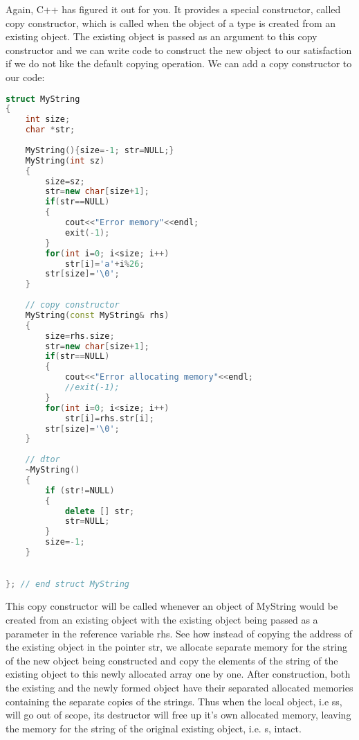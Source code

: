\documentclass[11pt,fleqn]{book} %
\begin{document}
Again, C++ has figured it out for you. It provides a special constructor, called copy constructor, which is called when the object of a type is created from an existing object. The existing object is passed as an argument to this copy constructor and we can write code to construct the new object to our satisfaction if we do not like the default copying operation. We can add a copy constructor to our code:
\begin{lstlisting}[language=C++, caption = Copy Constructor]
struct MyString 
{
	int size;
	char *str;
	
	MyString(){size=-1; str=NULL;} 
	MyString(int sz)
	{
		size=sz;
		str=new char[size+1];
		if(str==NULL)
		{
			cout<<"Error memory"<<endl;
			exit(-1);
		} 
		for(int i=0; i<size; i++)
			str[i]='a'+i%26;
		str[size]='\0';
	}
	
	// copy constructor
	MyString(const MyString& rhs)
	{
		size=rhs.size;
		str=new char[size+1];
		if(str==NULL)
		{
			cout<<"Error allocating memory"<<endl;
			//exit(-1);
		} 
		for(int i=0; i<size; i++)
			str[i]=rhs.str[i];
		str[size]='\0';
	}	
	
	// dtor
	~MyString()
	{
		if (str!=NULL)
		{
			delete [] str;
			str=NULL;
		} 
		size=-1; 
	}
	

}; // end struct MyString
\end{lstlisting}

\noindent This copy constructor will be called whenever an object of MyString would be created from an existing object with the existing object being passed as a parameter in the reference variable rhs. See how instead of copying the address of the existing object in the pointer str, we allocate separate memory for the string of the new object being constructed and copy the elements of the string of the existing object to this newly allocated array one by one. After construction, both the existing and the newly formed object have their separated allocated memories containing the separate copies of the strings. Thus when the local object, i.e ss,  will go out of scope, its destructor will free up it's own allocated memory, leaving the memory for the string of the original existing object, i.e. s, intact.
\end{document}
